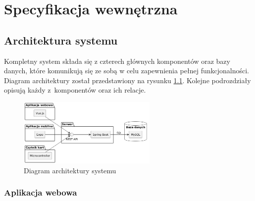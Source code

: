 \chapter{Specyfikacja wewnętrzna}
\label{ch:05}

\section{Architektura systemu}


Kompletny system składa się z czterech głównych komponentów oraz bazy danych, które komunikują się ze sobą w celu zapewnienia pełnej funkcjonalności. Diagram architektury został przedstawiony na rysunku \ref{fig:architecture}. Kolejne podrozdziały opisują każdy z~komponentów oraz ich relacje.

\begin{figure}[H]
    \centering
    \includegraphics[width=0.6\textwidth]{graf/systemScheme.png}
    \caption{Diagram architektury systemu}
    \label{fig:architecture}
\end{figure}

\subsection{Aplikacja webowa}

